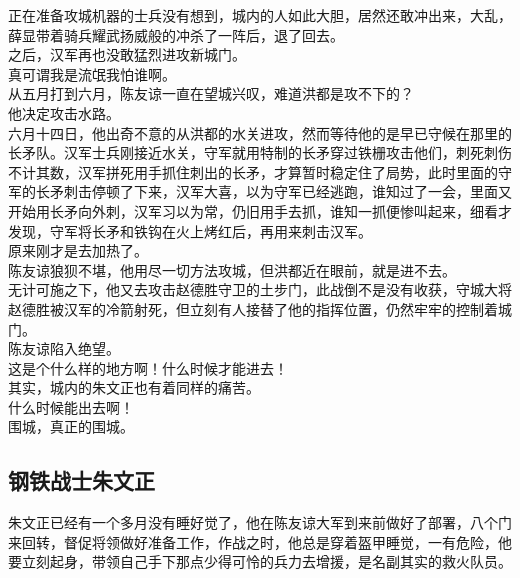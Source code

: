 \begin{multicols}{\theparacolNo}
正在准备攻城机器的士兵没有想到，城内的人如此大胆，居然还敢冲出来，大乱，薛显带着骑兵耀武扬威般的冲杀了一阵后，退了回去。\\

之后，汉军再也没敢猛烈进攻新城门。\\

真可谓我是流氓我怕谁啊。\\

从五月打到六月，陈友谅一直在望城兴叹，难道洪都是攻不下的？\\

他决定攻击水路。\\

六月十四日，他出奇不意的从洪都的水关进攻，然而等待他的是早已守候在那里的长矛队。汉军士兵刚接近水关，守军就用特制的长矛穿过铁栅攻击他们，刺死刺伤不计其数，汉军拼死用手抓住刺出的长矛，才算暂时稳定住了局势，此时里面的守军的长矛刺击停顿了下来，汉军大喜，以为守军已经逃跑，谁知过了一会，里面又开始用长矛向外刺，汉军习以为常，仍旧用手去抓，谁知一抓便惨叫起来，细看才发现，守军将长矛和铁钩在火上烤红后，再用来刺击汉军。\\

原来刚才是去加热了。\\

陈友谅狼狈不堪，他用尽一切方法攻城，但洪都近在眼前，就是进不去。\\

无计可施之下，他又去攻击赵德胜守卫的土步门，此战倒不是没有收获，守城大将赵德胜被汉军的冷箭射死，但立刻有人接替了他的指挥位置，仍然牢牢的控制着城门。\\

陈友谅陷入绝望。\\

这是个什么样的地方啊！什么时候才能进去！\\

其实，城内的朱文正也有着同样的痛苦。\\

什么时候能出去啊！\\

围城，真正的围城。\\

\subsection{钢铁战士朱文正}
朱文正已经有一个多月没有睡好觉了，他在陈友谅大军到来前做好了部署，八个门来回转，督促将领做好准备工作，作战之时，他总是穿着盔甲睡觉，一有危险，他要立刻起身，带领自己手下那点少得可怜的兵力去增援，是名副其实的救火队员。\\


\end{multicols}
